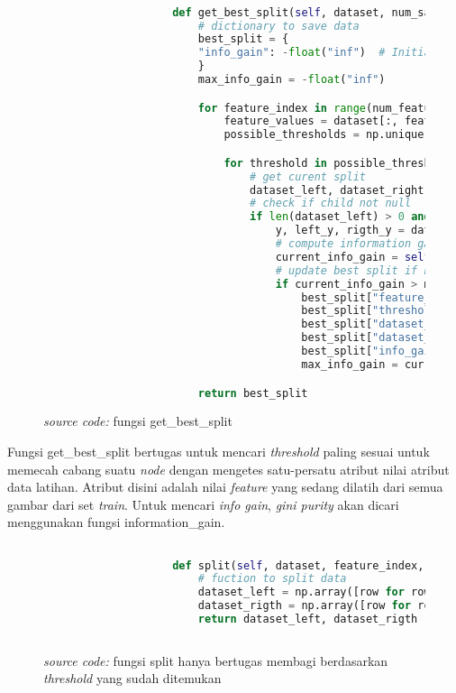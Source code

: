 		\begin{figure}[H]
			\begin{lstlisting}[language=Python, basicstyle=\tiny]

					def get_best_split(self, dataset, num_samples, num_features):
						# dictionary to save data
						best_split = {
						"info_gain": -float("inf")  # Initialize info_gain to a very small value
						} 
						max_info_gain = -float("inf")

						for feature_index in range(num_features):
							feature_values = dataset[:, feature_index]
							possible_thresholds = np.unique(feature_values)

							for threshold in possible_thresholds:
								# get curent split
								dataset_left, dataset_right = self.split(dataset, feature_index, threshold)
								# check if child not null
								if len(dataset_left) > 0 and len(dataset_right) > 0:
									y, left_y, rigth_y = dataset[:,-1], dataset_left[:,-1], dataset_right[:, -1]
									# compute information gain
									current_info_gain = self.information_gain(y, left_y, rigth_y, "gini")
									# update best split if needed
									if current_info_gain > max_info_gain:
										best_split["feature_index"] = feature_index
										best_split["threshold"] = threshold
										best_split["dataset_left"] = dataset_left
										best_split["dataset_right"] = dataset_right
										best_split["info_gain"] = current_info_gain
										max_info_gain = current_info_gain

						return best_split

			\end{lstlisting}
			\caption{\emph{source code:} fungsi get\_best\_split}
			\label{code: get split function}
		\end{figure}

		Fungsi get\_best\_split bertugas untuk mencari \textit{threshold} paling sesuai 
		untuk memecah cabang suatu \textit{node} dengan mengetes satu-persatu atribut nilai 
		atribut data latihan. Atribut disini adalah nilai \textit{feature} yang sedang dilatih 
		dari semua gambar dari set \textit{train}. Untuk mencari \textit{info gain}, \textit{gini purity} 
		akan dicari menggunakan fungsi information\_gain.

		\begin{figure}[H]
			\begin{lstlisting}[language=Python, basicstyle=\tiny]

					def split(self, dataset, feature_index, threshold):
						# fuction to split data 
						dataset_left = np.array([row for row in dataset if row[feature_index] <= threshold])
						dataset_rigth = np.array([row for row in dataset if row[feature_index] > threshold])
						return dataset_left, dataset_rigth
			
			\end{lstlisting}
			\caption{\emph{source code:} fungsi split hanya bertugas membagi berdasarkan \textit{threshold} 
			yang sudah ditemukan}
			\label{code: split function}
		\end{figure}

